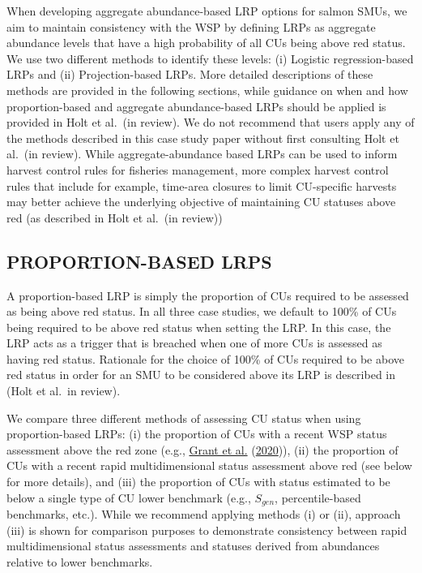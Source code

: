 \documentclass[11pt]{book}
\begin{document}
When developing aggregate abundance-based LRP options for salmon SMUs, we aim to maintain consistency with the WSP by defining LRPs as aggregate abundance levels that have a high probability of all CUs being above red status. We use two different methods to identify these levels: (i) Logistic regression-based LRPs and (ii) Projection-based LRPs. More detailed descriptions of these methods are provided in the following sections, while guidance on when and how proportion-based and aggregate abundance-based LRPs should be applied is provided in Holt et al.~(in review). We do not recommend that users apply any of the methods described in this case study paper without first consulting Holt et al.~(in review). While aggregate-abundance based LRPs can be used to inform harvest control rules for fisheries management, more complex harvest control rules that include for example, time-area closures to limit CU-specific harvests may better achieve the underlying objective of maintaining CU statuses above red (as described in Holt et al.~(in review))

\hypertarget{proportion-based-lrps}{%
\subsection{PROPORTION-BASED LRPS}\label{proportion-based-lrps}}

A proportion-based LRP is simply the proportion of CUs required to be assessed as being above red status. In all three case studies, we default to 100\% of CUs being required to be above red status when setting the LRP. In this case, the LRP acts as a trigger that is breached when one of more CUs is assessed as having red status. Rationale for the choice of 100\% of CUs required to be above red status in order for an SMU to be considered above its LRP is described in (Holt et al.~in review).

We compare three different methods of assessing CU status when using proportion-based LRPs: (i) the proportion of CUs with a recent WSP status assessment above the red zone (e.g., \protect\hyperlink{ref-grant2017FraserSockeye2020}{Grant et al.} (\protect\hyperlink{ref-grant2017FraserSockeye2020}{2020})), (ii) the proportion of CUs with a recent rapid multidimensional status assessment above red (see below for more details), and (iii) the proportion of CUs with status estimated to be below a single type of CU lower benchmark (e.g., \(S_{gen}\), percentile-based benchmarks, etc.). While we recommend applying methods (i) or (ii), approach (iii) is shown for comparison purposes to demonstrate consistency between rapid multidimensional status assessments and statuses derived from abundances relative to lower benchmarks.
\end{document}
